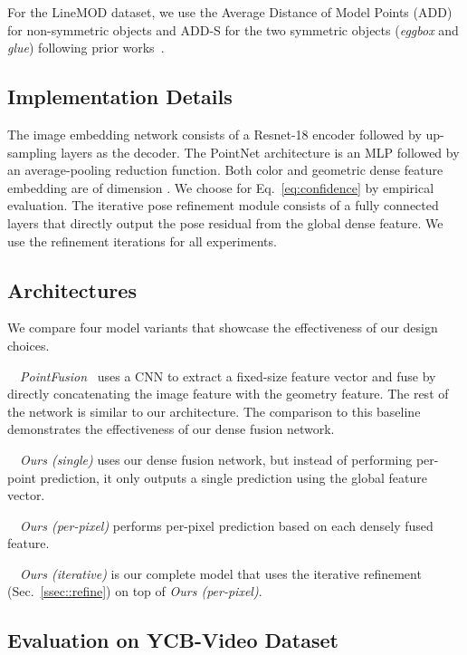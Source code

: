 \documentclass[10pt,twocolumn,letterpaper]{article}
\begin{document}
For the LineMOD dataset, we use the Average Distance of Model Points (ADD)~\cite{hinterstoisser2012model} for non-symmetric objects and ADD-S for the two symmetric objects (\textit{eggbox} and \textit{glue}) following prior works~\cite{hinterstoisser2012model,sundermeyer2018implicit,tekin18}.

\subsection{Implementation Details}
\label{ssec::implementation}
The image embedding network consists of a Resnet-18 encoder followed by  up-sampling layers as the decoder. The PointNet architecture is an MLP followed by an average-pooling reduction function. Both color and geometric dense feature embedding are of dimension . We choose  for Eq.~\ref{eq:confidence} by empirical evaluation. The iterative pose refinement module consists of a  fully connected layers that directly output the pose residual from the global dense feature. We use the  refinement iterations for all experiments.

\subsection{Architectures}
We compare four model variants that showcase the effectiveness of our design choices.

\noindent~\textbullet~\textit{PointFusion}~\cite{xu2017pointfusion} uses a CNN to extract a fixed-size feature vector and fuse by directly concatenating the image feature with the geometry feature. The rest of the network is similar to our architecture. The comparison to this baseline demonstrates the effectiveness of our dense fusion network.

\noindent~\textbullet~\textit{Ours (single)} uses our dense fusion network, but instead of performing per-point prediction, it only outputs a single prediction using the global feature vector.

\noindent~\textbullet~\textit{Ours (per-pixel)} performs per-pixel prediction based on each densely fused feature.

\noindent~\textbullet~\textit{Ours (iterative)} is our complete model that uses the iterative refinement (Sec.~\ref{ssec::refine}) on top of \textit{Ours (per-pixel)}.

\subsection{Evaluation on YCB-Video Dataset}
\label{sec:eval_ycb}
\end{document}
